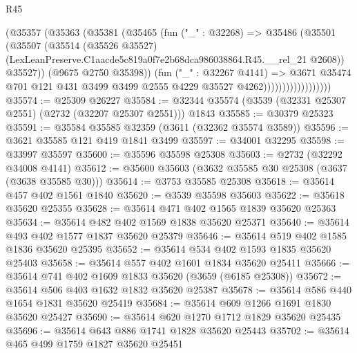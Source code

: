 \begin{lexlean}{R45}
\begin{coremodule}
                              (@35357
                                (@35363
                                  (@35381
                                    (@35465
                                      (fun ("_" : @32268) =>
                                      @35486
                                        (@35501
                                          (@35507
                                            (@35514
                                              (@35526 @35527)
                                              (LexLeanPreserve.C1aacde5c819a0f7e2b68dca986038864.R45.__rel_21
                                                @2608))
                                            @35527))
                                        (@9675 @2750 @35398))
                                      (fun ("_" : @32267 @4141) =>
                                      @3671
                                        @35474
                                        @701
                                        @121
                                        @431
                                        @3499
                                        @3499
                                        @2555
                                        @4229
                                        @35527
                                        @4262))))))))))))))))))
@35574 := @25309 @26227
@35584 := @32344 @35574 (@3539 (@32331 @25307 @2551) (@2732 (@32207 @25307 @2551))) @1843
@35585 := @30379 @25323
@35591 := @35584 @35585 @32359 (@3611 (@32362 @35574 @3589))
@35596 := @3621 @35585 @121 @419 @1841 @3499
@35597 := @34001 @32295
@35598 := @33997 @35597
@35600 := @35596 @35598 @25308
@35603 := @2732 (@32292 @34008 @4141)
@35612 := @35600 @35603 (@3632 @35585 @30 @25308 (@3637 (@3638 @35585 @30)))
@35614 := @3753 @35585 @25308
@35618 := @35614 @457 @402 @1561 @1840
@35620 := @3539 @35598 @35603
@35622 := @35618 @35620 @25355
@35628 := @35614 @471 @402 @1565 @1839 @35620 @25363
@35634 := @35614 @482 @402 @1569 @1838 @35620 @25371
@35640 := @35614 @493 @402 @1577 @1837 @35620 @25379
@35646 := @35614 @519 @402 @1585 @1836 @35620 @25395
@35652 := @35614 @534 @402 @1593 @1835 @35620 @25403
@35658 := @35614 @557 @402 @1601 @1834 @35620 @25411
@35666 := @35614 @741 @402 @1609 @1833 @35620 (@3659 (@6185 @25308))
@35672 := @35614 @506 @403 @1632 @1832 @35620 @25387
@35678 := @35614 @586 @440 @1654 @1831 @35620 @25419
@35684 := @35614 @609 @1266 @1691 @1830 @35620 @25427
@35690 := @35614 @620 @1270 @1712 @1829 @35620 @25435
@35696 := @35614 @643 @886 @1741 @1828 @35620 @25443
@35702 := @35614 @465 @499 @1759 @1827 @35620 @25451

\end{coremodule}
\end{lexlean}
